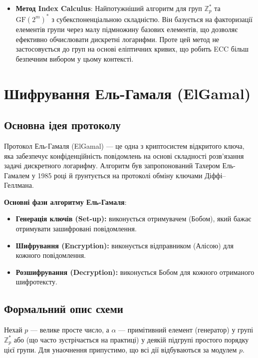 \documentclass[12pt]{report}
\theoremstyle{definition}
\theoremstyle{plain}
\begin{document}
\begin{itemize}
    \item \textbf{Метод Index Calculus}: Найпотужніший алгоритм для груп \( \mathbb{Z}^*_p \) та \( \text{GF}(2^m)^* \) з субекспоненціальною складністю. Він базується на факторизації елементів групи через малу підмножину базових елементів, що дозволяє ефективно обчислювати дискретні логарифми. Проте цей метод не застосовується до груп на основі еліптичних кривих, що робить ECC більш безпечним вибором у цьому контексті.
\end{itemize}


\chapter{Шифрування Ель-Гамаля (ElGamal)}

\section{Основна ідея протоколу}

Протокол Ель-Гамаля (ElGamal) — це одна з криптосистем відкритого ключа, 
яка забезпечує конфіденційність повідомлень на основі складності розв’язання 
задачі дискретного логарифму. Алгоритм був запропонований Тахером Ель-Гамалем 
у 1985 році й ґрунтується на протоколі обміну ключами Діффі–Геллмана.

\textbf{Основні фази алгоритму Ель-Гамаля}: 
\begin{itemize}
    \item \textbf{Генерація ключів (Set-up):} виконується отримувачем (Бобом), 
    який бажає отримувати зашифровані повідомлення.
    \item \textbf{Шифрування (Encryption):} виконується відправником (Алісою) для кожного повідомлення.
    \item \textbf{Розшифрування (Decryption):} виконується Бобом для кожного отриманого шифротексту.
\end{itemize}

\section{Формальний опис схеми}

Нехай \(p\) — велике просте число, а \(\alpha\) — примітивний елемент 
(генератор) у групі \(\mathbb{Z}_p^*\) або (що часто зустрічається на практиці) у деякій 
підгрупі простого порядку цієї групи. Для унаочнення припустимо, що всі дії 
відбуваються за модулем \(p\).
\end{document}
